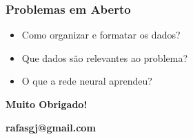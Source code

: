 \documentclass[aspectratio=169,12pt]{beamer}
\begin{document}
\begin{frame}
    \frametitle{Problemas em Aberto}
    \begin{itemize}
        \setlength\itemsep{1em}
        \item{Como organizar e formatar os dados?}
        \item{Que dados são relevantes ao problema?}
        \item{O que a rede neural aprendeu?}
    \end{itemize}
\end{frame}

\begin{frame}[b]
    \begin{center}
    \Huge \bfseries Muito Obrigado!
    \end{center}
    \vfill
    \hfill \textbf{rafasgj@gmail.com}
\end{frame}
    
\end{document}
